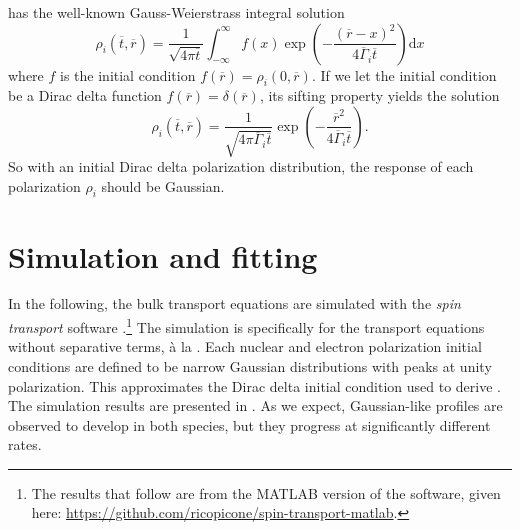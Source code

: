 \documentclass[onecolumn]{amsart}
\begin{document}
 has the well-known Gauss-Weierstrass integral solution \cite{merryfield2009}
\begin{equation}
\label{eq:solution}
\rho_i(\overline{t},\overline{r}) =
\frac{1}{\sqrt{4\pi \overline{t}}}
\int_{-\infty}^\infty f(x) \exp\!\left(-\frac{(\overline{r}-x)^2}{4 \overline{\Gamma}_i \overline{t}}\right) \mathrm{d}x
\end{equation}
where \(f\) is the initial condition \(f(\overline{r}) = \rho_i(0,\overline{r})\).
If we let the initial condition be a Dirac delta function \(f(\overline{r}) = \delta(\overline{r})\), its sifting property yields the solution
\begin{equation}
\label{eq:solution-dirac}
\rho_i(\overline{t},\overline{r}) =
\frac{1}{\sqrt{4\pi \overline{\Gamma}_i \overline{t}}}
\exp\!\left(-\frac{\overline{r}^2}{4 \overline{\Gamma}_i \overline{t}}\right).
\end{equation}
So with an initial Dirac delta polarization distribution, the response of each polarization \(\rho_i\) should be Gaussian.

\section{Simulation and fitting}
\label{sec:org795705d}
In the following, the bulk transport equations are simulated with the \emph{spin transport} software \cite{Picone2019}.\footnote{The results that follow are from the MATLAB version of the software, given here: \url{https://github.com/ricopicone/spin-transport-matlab}.}
The simulation is specifically for the transport equations without separative terms, à la .
Each nuclear and electron polarization initial conditions are defined to be narrow Gaussian distributions with peaks at unity polarization.
This approximates the Dirac delta initial condition used to derive .
The simulation results are presented in .
As we expect, Gaussian-like profiles are observed to develop in both species, but they progress at significantly different rates.
\end{document}
